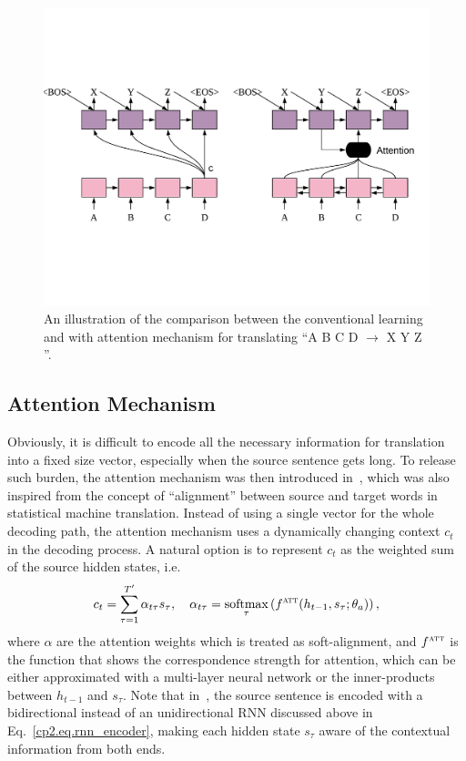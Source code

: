 \begin{figure}
    \centering
    \includegraphics[width=\textwidth]{figs/background/s2s_att.pdf}
    \caption{An illustration of the comparison between the conventional \sts learning and \sts with attention mechanism for translating ``A B C D $\rightarrow$ X Y Z ''.}
    \label{cp2.fig.comparison}
\end{figure}

\subsection{Attention Mechanism}
Obviously, it is difficult to encode all the necessary information for translation into a fixed size vector, especially when the source sentence gets long. 
To release such burden, the attention mechanism was then introduced in~, which was also inspired from the concept of ``alignment'' between source and target words in statistical machine translation. Instead of using a single vector for the whole decoding path, the attention mechanism uses a dynamically changing context $c_t$ in the decoding process. A natural option is to represent $c_t$ as the weighted sum of the source hidden states, i.e.
\begin{equation} 
    \label{cp2.eq.att}
	c_t = \sum_{\tau=1}^{T'}{\alpha_{t\tau} s_{\tau}}, \quad \alpha_{t\tau} =  \mathop{\operatorname{\text{softmax}}}\limits_\tau\left(f^{\textsc{att}}(h_{t-1}, s_{\tau}; \theta_a)\right),
\end{equation}
where $\alpha$ are the attention weights which is treated as soft-alignment, and $f^{\textsc{att}}$ is the function that shows the correspondence strength for attention, which can be either approximated with a multi-layer neural network or the inner-products between $h_{t-1}$ and $s_\tau$. 
Note that in~, the source sentence is encoded with a bidirectional instead of an unidirectional RNN discussed above in Eq.~\ref{cp2.eq.rnn_encoder}, making each hidden state $s_{\tau}$ aware of the contextual information from both ends. 


